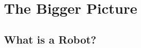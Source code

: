\documentclass[man]{apa6}
\begin{document}
\section{The Bigger Picture}
\subsection{What is a Robot?}
\par
\end{document}
